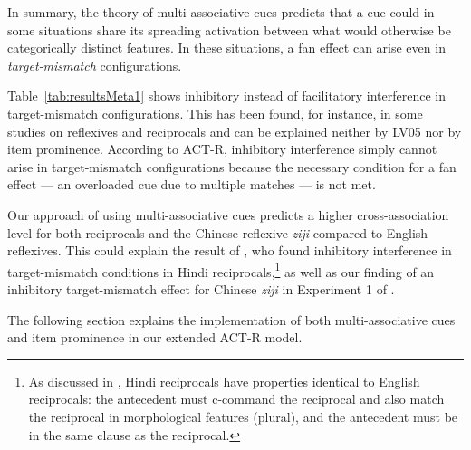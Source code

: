 \documentclass{cambridge7A}\usepackage[]{graphicx}\usepackage[]{color}
\newcommand{\revFE}[1]{#1}
\begin{document}



In summary, the theory of multi-associative cues predicts that a cue could in some situations share its spreading activation between what would otherwise be categorically distinct features. In these situations, a fan effect can arise even in \emph{target-mismatch} configurations. 
\revFE{
Table~\ref{tab:resultsMeta1} shows inhibitory instead of facilitatory interference in target-mismatch configurations. This has been found, for instance, in some studies on reflexives and reciprocals and can be explained neither by LV05 nor by item prominence. 
According to ACT-R, inhibitory interference simply cannot arise in target-mismatch configurations because the necessary condition for a fan effect --- an overloaded cue due to multiple matches --- is not met.
}
\revFE{Our approach of using multi-associative cues} predicts a higher cross-association level for both reciprocals and the Chinese reflexive \textit{ziji} compared to English reflexives. This could explain the result of \cite{KushPhillips2014}, who found inhibitory interference in target-mismatch conditions in Hindi reciprocals,\footnote{As discussed in \cite{KushPhillips2014}, Hindi reciprocals have properties identical to English reciprocals: the antecedent must c-command the reciprocal and also match the reciprocal in morphological features (plural), and the antecedent must be in the same clause as the reciprocal.} 
as well as our finding of an inhibitory target-mismatch effect for Chinese \textit{ziji} in Experiment 1 of \cite{JaegerEngelmannVasishth2015}.

The following section explains the implementation of both multi-associative cues and item prominence in our extended ACT-R model.

\end{document}
